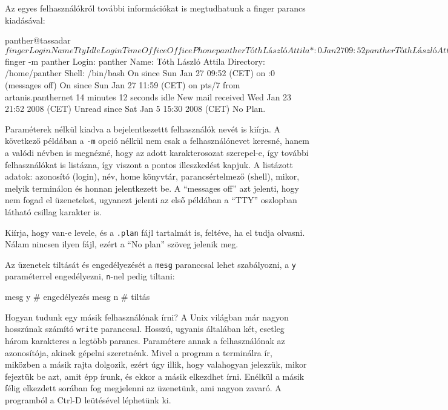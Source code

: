 Az egyes felhasználókról további információkat is megtudhatunk a finger parancs
kiadásával:

\begin{VerbExample}
panther@tassadar ~ $ finger
Login    Name                   Tty      Idle  Login Time   Office     Office Phone
panther  Tóth László Attila *:0             Jan 27 09:52
panther  Tóth László Attila  pts/7      13  Jan 27 11:59 (artanis.panthernet)
panther@tassadar ~ $ finger -m panther
Login: panther                          Name: Tóth László Attila
Directory: /home/panther                Shell: /bin/bash
On since Sun Jan 27 09:52 (CET) on :0 (messages off)
On since Sun Jan 27 11:59 (CET) on pts/7 from artanis.panthernet
   14 minutes 12 seconds idle
New mail received Wed Jan 23 21:52 2008 (CET)
     Unread since Sat Jan  5 15:30 2008 (CET)
No Plan.
\end{VerbExample}

Paraméterek nélkül kiadva a bejelentkezettt felhasználók nevét is kiírja. A
következő példában a \texttt{-m} opció nélkül nem csak a felhasználónevet
keresné, hanem a valódi névben is megnézné, hogy az adott karakterosozat
szerepel-e, így további felhasználókat is listázna, így viszont a pontos
illeszkedést kapjuk. A listázott adatok: azonosító (login), név, home könyvtár,
parancsértelmező (shell), mikor, melyik terminálon és honnan jelentkezett be. A
``messages off'' azt jelenti, hogy nem fogad el üzeneteket, ugyanezt jelenti az
első példában a ``TTY'' oszlopban látható csillag karakter is.

Kiírja, hogy van-e levele, és a \texttt{.plan} fájl tartalmát is, feltéve, ha el
tudja olvasni. Nálam nincsen ilyen fájl, ezért a ``No plan'' szöveg jelenik meg.

Az üzenetek tiltását és engedélyezését a \texttt{mesg} paranccsal lehet
szabályozni, a \texttt{y} paraméterrel engedélyezni, \texttt{n}-nel pedig
tiltani:

\begin{VerbExample}
mesg y              # engedélyezés
mesg n              # tiltás
\end{VerbExample}


Hogyan tudunk egy másik felhasználónak írni? A Unix világban már nagyon
hosszúnak számító \texttt{write} paranccsal. Hosszú, ugyanis általában két,
esetleg három karakteres a legtöbb parancs. Paramétere annak a felhasználónak az
azonosítója, akinek gépelni szeretnénk. Mivel a program a terminálra ír,
miközben a másik rajta dolgozik, ezért úgy illik, hogy valahogyan jelezzük,
mikor fejeztük be azt, amit épp írunk, és ekkor a másik elkezdhet írni. Enélkül
a másik félig elkezdett sorában fog megjelenni az üzenetünk, ami nagyon zavaró.
A programból a Ctrl-D leütésével léphetünk ki.

